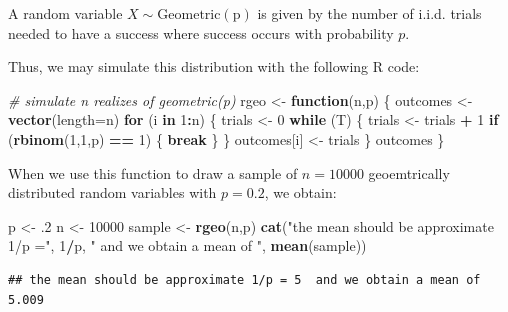 \documentclass[
]{article}
\newenvironment{Shaded}{\begin{snugshade}}{\end{snugshade}}
\newcommand{\AttributeTok}[1]{\textcolor[rgb]{0.13,0.29,0.53}{#1}}
\newcommand{\CommentTok}[1]{\textcolor[rgb]{0.56,0.35,0.01}{\textit{#1}}}
\newcommand{\ControlFlowTok}[1]{\textcolor[rgb]{0.13,0.29,0.53}{\textbf{#1}}}
\newcommand{\DecValTok}[1]{\textcolor[rgb]{0.00,0.00,0.81}{#1}}
\newcommand{\FunctionTok}[1]{\textcolor[rgb]{0.13,0.29,0.53}{\textbf{#1}}}
\newcommand{\NormalTok}[1]{#1}
\newcommand{\OtherTok}[1]{\textcolor[rgb]{0.56,0.35,0.01}{#1}}
\newcommand{\SpecialCharTok}[1]{\textcolor[rgb]{0.81,0.36,0.00}{\textbf{#1}}}
\newcommand{\StringTok}[1]{\textcolor[rgb]{0.31,0.60,0.02}{#1}}
\begin{document}
A random variable \(X \sim \operatorname{Geometric(p)}\) is given by the
number of i.i.d. trials needed to have a success where success occurs
with probability \(p\).

Thus, we may simulate this distribution with the following R code:

\begin{Shaded}
\begin{Highlighting}[]
\CommentTok{\# simulate n realizes of geometric(p)}
\NormalTok{rgeo }\OtherTok{\textless{}{-}} \ControlFlowTok{function}\NormalTok{(n,p)}
\NormalTok{\{}
\NormalTok{  outcomes }\OtherTok{\textless{}{-}} \FunctionTok{vector}\NormalTok{(}\AttributeTok{length=}\NormalTok{n)}
  \ControlFlowTok{for}\NormalTok{ (i }\ControlFlowTok{in} \DecValTok{1}\SpecialCharTok{:}\NormalTok{n)}
\NormalTok{  \{}
\NormalTok{    trials }\OtherTok{\textless{}{-}} \DecValTok{0}
    \ControlFlowTok{while}\NormalTok{ (T)}
\NormalTok{    \{}
\NormalTok{      trials }\OtherTok{\textless{}{-}}\NormalTok{ trials }\SpecialCharTok{+} \DecValTok{1}
      \ControlFlowTok{if}\NormalTok{ (}\FunctionTok{rbinom}\NormalTok{(}\DecValTok{1}\NormalTok{,}\DecValTok{1}\NormalTok{,p) }\SpecialCharTok{==} \DecValTok{1}\NormalTok{)}
\NormalTok{      \{}
        \ControlFlowTok{break}
\NormalTok{      \}}
\NormalTok{    \}}
\NormalTok{    outcomes[i] }\OtherTok{\textless{}{-}}\NormalTok{ trials}
\NormalTok{  \}}
\NormalTok{  outcomes}
\NormalTok{\}}
\end{Highlighting}
\end{Shaded}

When we use this function to draw a sample of \(n=10000\) geoemtrically
distributed random variables with \(p=0.2\), we obtain:

\begin{Shaded}
\begin{Highlighting}[]
\NormalTok{p }\OtherTok{\textless{}{-}}\NormalTok{ .}\DecValTok{2}
\NormalTok{n }\OtherTok{\textless{}{-}} \DecValTok{10000}
\NormalTok{sample }\OtherTok{\textless{}{-}} \FunctionTok{rgeo}\NormalTok{(n,p)}
\FunctionTok{cat}\NormalTok{(}\StringTok{"the mean should be approximate 1/p ="}\NormalTok{, }\DecValTok{1}\SpecialCharTok{/}\NormalTok{p, }\StringTok{" and we obtain a mean of "}\NormalTok{, }\FunctionTok{mean}\NormalTok{(sample))}
\end{Highlighting}
\end{Shaded}

\begin{verbatim}
## the mean should be approximate 1/p = 5  and we obtain a mean of  5.009
\end{verbatim}
\end{document}
